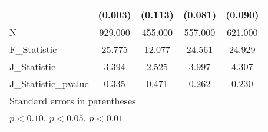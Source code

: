 {\begin{tabular}{l*{4}{c}}
            &     (0.003)         &     (0.113)         &     (0.081)         &     (0.090)         \\
\hline
N           &     929.000         &     455.000         &     557.000         &     621.000         \\
F\_Statistic &      25.775         &      12.077         &      24.561         &      24.929         \\
J\_Statistic &       3.394         &       2.525         &       3.997         &       4.307         \\
J\_Statistic\_pvalue&       0.335         &       0.471         &       0.262         &       0.230         \\
\hline\hline
\multicolumn{5}{l}{\footnotesize Standard errors in parentheses}\\
\multicolumn{5}{l}{\footnotesize \sym{*} \(p<0.10\), \sym{**} \(p<0.05\), \sym{***} \(p<0.01\)}\\
\end{tabular}
}
